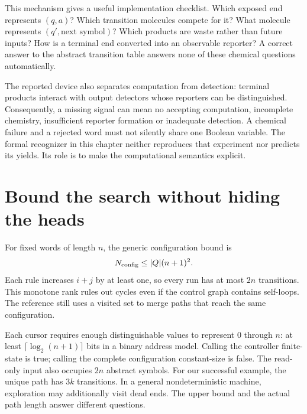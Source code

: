 
This mechanism gives a useful implementation checklist. Which exposed end
represents $(q,a)$? Which transition molecules compete for it? What molecule
represents $(q',\text{next symbol})$? Which products are waste rather than
future inputs? How is a terminal end converted into an observable reporter?
A correct answer to the abstract transition table answers none of these
chemical questions automatically.

The reported device also separates computation from detection: terminal
products interact with output detectors whose reporters can be distinguished.
Consequently, a missing signal can mean no accepting computation, incomplete
chemistry, insufficient reporter formation or inadequate detection. A chemical
failure and a rejected word must not silently share one Boolean variable.
The formal recognizer in this chapter neither reproduces that experiment nor
predicts its yields. Its role is to make the computational semantics explicit.



\section{Bound the search without hiding the heads}
For fixed words of length $n$, the generic configuration bound is
\begin{equation}
 N_{\rm config}\leq |Q|(n+1)^2.
\end{equation}
Each rule increases $i+j$ by at least one, so every run has at most $2n$
transitions. This monotone rank rules out cycles even if the control graph
contains self-loops. The reference still uses a visited set to merge paths
that reach the same configuration.


Each cursor requires enough distinguishable values to represent $0$ through
$n$: at least $\lceil\log_2(n+1)\rceil$ bits in a binary address model.
Calling the controller finite-state is true; calling the complete configuration
constant-size is false. The read-only input also occupies $2n$ abstract symbols.
For our successful example, the unique path has $3k$ transitions. In a general
nondeterministic machine, exploration may additionally visit dead ends.
The upper bound and the actual path length
answer different questions.

